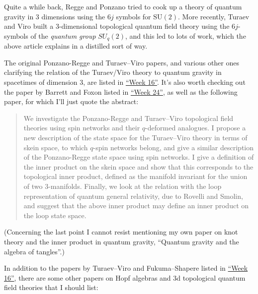 \documentclass[12pt]{article}
\def\tightlist{}
\renewcommand{\texttt}[1]{%
  \begingroup
  \ttfamily
  \begingroup\lccode`~=`/\lowercase{\endgroup\def~}{/\discretionary{}{}{}}%
  \begingroup\lccode`~=`[\lowercase{\endgroup\def~}{[\discretionary{}{}{}}%
  \begingroup\lccode`~=`.\lowercase{\endgroup\def~}{.\discretionary{}{}{}}%
  \catcode`/=\active\catcode`[=\active\catcode`.=\active
  \scantokens{#1\noexpand}%
  \endgroup
}
\begin{document}
Quite a while back, Regge and Ponzano tried to cook up a theory of
quantum gravity in 3 dimensions using the \(6j\) symbols for
\(\mathrm{SU}(2)\). More recently, Turaev and Viro built a
\(3\)-dimensional topological quantum field theory using the
\(6j\)-symbols of the \emph{quantum group} \(SU_q(2)\), and this led to
lots of work, which the above article explains in a distilled sort of
way.

The original Ponzano-Regge and Turaev--Viro papers, and various other
ones clarifying the relation of the Turaev/Viro theory to quantum
gravity in spacetimes of dimension 3, are listed in
\protect\hyperlink{week16}{``Week 16''}. It's also worth checking out
the paper by Barrett and Foxon listed in
\protect\hyperlink{week24}{``Week 24''}, as well as the following paper,
for which I'll just quote the abstract:


\begin{quote}
We investigate the Ponzano-Regge and Turaev--Viro topological field
theories using spin networks and their \(q\)-deformed analogues. I
propose a new description of the state space for the Turaev--Viro theory
in terms of skein space, to which \(q\)-spin networks belong, and give a
similar description of the Ponzano-Regge state space using spin
networks. I give a definition of the inner product on the skein space
and show that this corresponds to the topological inner product, defined
as the manifold invariant for the union of two 3-manifolds. Finally, we
look at the relation with the loop representation of quantum general
relativity, due to Rovelli and Smolin, and suggest that the above inner
product may define an inner product on the loop state space.
\end{quote}

(Concerning the last point I cannot resist mentioning my own paper on
knot theory and the inner product in quantum gravity, ``Quantum gravity
and the algebra of tangles''.)

In addition to the papers by Turaev--Viro and Fukuma--Shapere listed in
\protect\hyperlink{week16}{``Week 16''}, there are some other papers on
Hopf algebras and 3d topological quantum field theories that I should
list:
\end{document}
